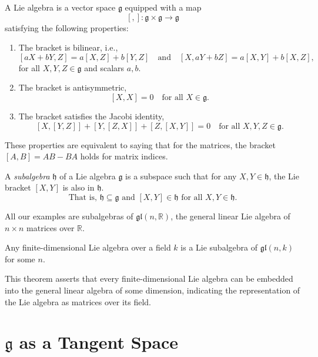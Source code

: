 \documentclass{article}
\begin{document}
\begin{theorem}
    A Lie algebra is a vector space \(\mathfrak{g}\) equipped with a map 
\[
[,]: \mathfrak{g} \times \mathfrak{g} \rightarrow \mathfrak{g}
\]
satisfying the following properties:
\begin{enumerate}
    \item The bracket is bilinear, i.e.,
    \[
    [aX + bY, Z] = a[X, Z] + b[Y, Z] \quad \text{and} \quad [X, aY + bZ] = a[X, Y] + b[X, Z],
    \]
    for all \(X, Y, Z \in \mathfrak{g}\) and scalars \(a, b\).

    \item The bracket is antisymmetric,
    \[
    [X, X] = 0 \quad \text{for all } X \in \mathfrak{g}.
    \]

    \item The bracket satisfies the Jacobi identity,
    \[
    [X, [Y, Z]] + [Y, [Z, X]] + [Z, [X, Y]] = 0 \quad \text{for all } X, Y, Z \in \mathfrak{g}.
    \]
\end{enumerate}
    
\end{theorem}
These properties are equivalent to saying that for the matrices, the bracket \([A, B] = AB - BA\) holds for matrix indices.

\begin{theorem}
A \emph{subalgebra} \(\mathfrak{h}\) of a Lie algebra \(\mathfrak{g}\) is a subspace such that for any \(X, Y \in \mathfrak{h}\), the Lie bracket \([X, Y]\) is also in \(\mathfrak{h}\). 
\[
\text{That is, } \mathfrak{h} \subseteq \mathfrak{g} \text{ and } [X, Y] \in \mathfrak{h} \text{ for all } X, Y \in \mathfrak{h}.
\]    
\end{theorem}

All our examples are subalgebras of \(\mathfrak{gl}(n, \mathbb{R})\), the general linear Lie algebra of \(n \times n\) matrices over \(\mathbb{R}\).

\begin{theorem}
Any finite-dimensional Lie algebra over a field \( k \) is a Lie subalgebra of \(\mathfrak{gl}(n, k)\) for some \( n \).    
\end{theorem}
This theorem asserts that every finite-dimensional Lie algebra can be embedded into the general linear algebra of some dimension, indicating the representation of the Lie algebra as matrices over its field.


\section{\(\mathfrak{g}\) as a Tangent Space}
\end{document}

